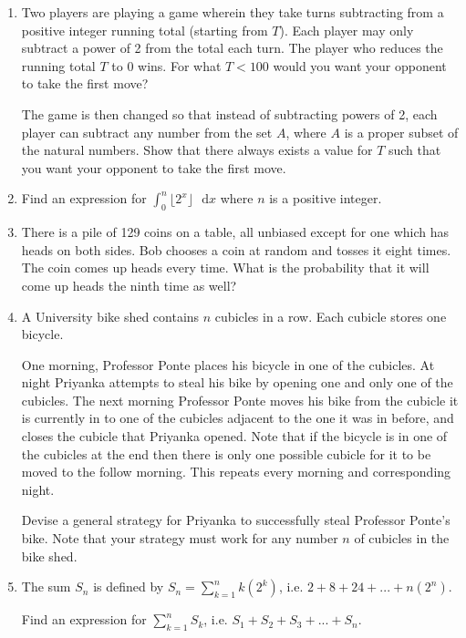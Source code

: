 \documentclass[a4paper]{article}
\begin{document}
\begin{enumerate}
    \item
    Two players are playing a game wherein they take turns subtracting from a positive integer running total (starting from $T$). Each player may only subtract a power of 2 from the total each turn. The player who reduces the running total $T$ to 0 wins. For what $T<100$ would you want your opponent to take the first move?
    
    The game is then changed so that instead of subtracting powers of 2, each player can subtract any number from the set $A$, where $A$ is a proper subset of the natural numbers. Show that there always exists a value for $T$ such that you want your opponent to take the first move.
    
    \item
    Find an expression for $\int_0^n \lfloor 2^x \rfloor \text{ } \mathrm{d}x$ where $n$ is a positive integer.
    
    \item
    There is a pile of 129 coins on a table, all unbiased except for one which has heads on both sides. Bob chooses a coin at random and tosses it eight times. The coin comes up heads every time. What is the probability that it will come up heads the ninth time as well?
    
    \item
    A University bike shed contains $n$ cubicles in a row. Each cubicle stores one bicycle. 
    
    One morning, Professor Ponte places his bicycle in one of the cubicles. At night Priyanka attempts to steal his bike by opening one and only one of the cubicles. The next morning Professor Ponte moves his bike from the cubicle it is currently in to one of the cubicles adjacent to the one it was in before, and closes the cubicle that Priyanka opened. Note that if the bicycle is in one of the cubicles at the end then there is only one possible cubicle for it to be moved to the follow morning. This repeats every morning and corresponding night.
    
    Devise a general strategy for Priyanka to successfully steal Professor Ponte's bike. Note that your strategy must work for any number $n$ of cubicles in the bike shed.
    
    \item
    The sum $S_n$ is defined by $S_n = \sum\limits_{k=1}^{n} k(2^k)$, i.e. $2 + 8 + 24 + ... + n(2^n)$.
    
    Find an expression for $\sum\limits_{k=1}^n S_k$, i.e. $S_1 + S_2 + S_3 + ... + S_n$.
    

\end{enumerate}
\end{document}
